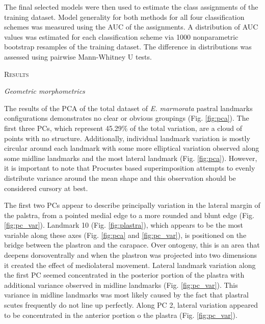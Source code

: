 \documentclass[12pt,letterpaper]{article}\usepackage{graphicx, color}
\renewcommand{\section}[1]{%
\bigskip
\begin{center}
\begin{Large}
\normalfont\scshape #1
\medskip
\end{Large}
\end{center}}
\renewcommand{\subsection}[1]{%
\bigskip
\begin{center}
\begin{large}
\normalfont\itshape #1
\end{large}
\end{center}}
\begin{document}
The final selected models were then used to estimate the class assignments of the training dataset. Model generality for both methods for all four classification schemes was measured using the AUC of the assignments. A distribution of AUC values was estimated for each classification scheme via 1000 nonparametric bootstrap resamples of the training dataset. The difference in distributions was assessed using pairwise Mann-Whitney U tests.

\section{Results}
\subsection{Geometric morphometrics}
The results of the PCA of the total dataset of \textit{E. marmorata} pastral landmarks configurations demonstrates no clear or obvious groupings (Fig. \ref{fig:pca}). The first three PCs, which represent 45.29\% of the total variation, are a cloud of points with no structure. Additionally, individual landmark variation is mostly circular around each landmark with some more elliptical variation observed along some midline landmarks and the most lateral landmark (Fig. \ref{fig:pca}). However, it is important to note that Procustes based superimposition attempts to evenly distribute variance around the mean shape \citep{Zelditch2004} and this observation should be considered cursory at best.

The first two PCs appear to describe principally variation in the lateral margin of the palstra, from a pointed medial edge to a more rounded and blunt edge (Fig. \ref{fig:pc_var}). Landmark 10 (Fig. \ref{fig:plastra}), which appears to be the most variable along these axes (Fig. \ref{fig:pca} and \ref{fig:pc_var}), is positioned on the bridge between the plastron and the carapace. Over ontogeny, this is an area that deepens dorsoventrally and when the plastron was projected into two dimensions it created the effect of mediolateral movement.
Lateral landmark variation along the first PC seemed concentrated in the posterior portion of the plastra with additional variance observed in midline landmarks (Fig. \ref{fig:pc_var}). This variance in midline landmarks was most likely caused by the fact that plastral scutes frequently do not line up perfectly. Along PC 2, lateral variation appeared to be concentrated in the anterior portion o the plastra (Fig. \ref{fig:pc_var}).
\end{document}
